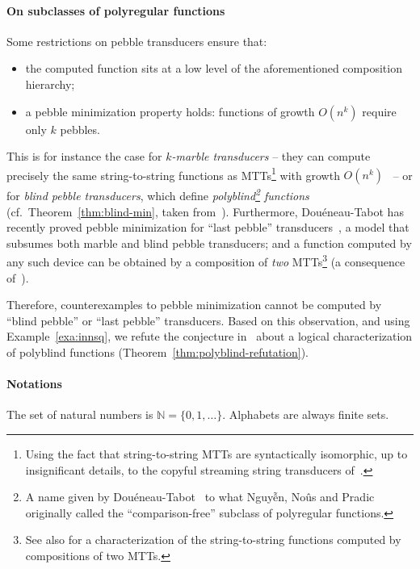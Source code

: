 \documentclass{fundam}
\newcommand{\bbN}{\mathbb{N}}
\theoremstyle{claimstyle}
\begin{document}
\paragraph{On subclasses of polyregular functions}
Some restrictions on pebble transducers ensure that:
\begin{itemize}
  \item the computed function sits at a low level of the aforementioned composition hierarchy;
  \item a pebble minimization property holds: functions of growth $O(n^k)$
    require only $k$ pebbles.
\end{itemize}
This is for instance the case for \emph{$k$-marble transducers} -- they can
compute precisely the same string-to-string functions as MTTs\footnote{Using the
  fact that string-to-string MTTs are syntactically isomorphic, up to
  insignificant details, to the copyful streaming string transducers
  of~\cite{CopyfulSST}.} with growth $O(n^k)$~\cite[\S5]{Marble} -- or for
\emph{blind pebble transducers}, which define \emph{polyblind\footnote{A name
    given by
    Douéneau-Tabot~\cite{UnaryOutput,doueneautabot2022hiding,LastPebble} to what
    {\selectfont Nguyễn}, Noûs and Pradic~\cite{NguyenNP21}
    originally called the \enquote{comparison-free} subclass of polyregular
    functions.} functions} (cf.~Theorem~\ref{thm:blind-min}, taken
from~\cite{NguyenNP21}). Furthermore, Douéneau-Tabot has recently proved
pebble minimization for \enquote{last pebble} transducers~\cite{LastPebble}, a
model that subsumes both marble and blind pebble transducers; and a function
computed by any such device can be obtained by a composition of \emph{two}
MTTs\footnote{See also \cite{lvl3} for a characterization of the
  string-to-string functions computed by compositions of two MTTs.} (a
consequence of~\cite[Theorem~53~(in~\S15)]{InvisiblePebbles}).

Therefore, counterexamples to pebble minimization cannot be computed by
\enquote{blind pebble} or \enquote{last pebble} transducers. Based on this
observation, and using Example~\ref{exa:innsq}, we refute the conjecture
in~\cite{NguyenNP21} about a logical characterization of polyblind functions
(Theorem~\ref{thm:polyblind-refutation}).

\paragraph{Notations}

The set of natural numbers is $\bbN=\{0,1,\dots\}$. Alphabets are always finite sets.
\end{document}
